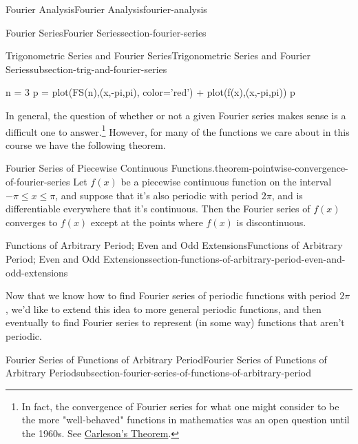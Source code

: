 \documentclass[oneside,10pt,]{book}
\numberwithin{equation}{section}
\begin{document}
\begin{chapterptx}{Fourier Analysis}{}{Fourier Analysis}{}{}{fourier-analysis}
\begin{sectionptx}{Fourier Series}{}{Fourier Series}{}{}{section-fourier-series}
\begin{subsectionptx}{Trigonometric Series and Fourier Series}{}{Trigonometric Series and Fourier Series}{}{}{subsection-trig-and-fourier-series}
\begin{sageinput}
n = 3
p = plot(FS(n),(x,-pi,pi), color='red') + plot(f(x),(x,-pi,pi))
p
\end{sageinput}
\hypertarget{p-585}{}%
In general, the question of whether or not a given Fourier series makes sense is a difficult one to answer.\footnote{In fact, the convergence of Fourier series for what one might consider to be the more "well-behaved" functions in mathematics was an open question until the 1960s. See \href{https://en.wikipedia.org/wiki/Carleson\%27s_theorem}{Carleson's Theorem}.\label{footnote-convergence-of-fourier-series}} However, for many of the functions we care about in this course we have the following theorem.%
\begin{theorem}{Fourier Series of Piecewise Continuous Functions.}{}{theorem-pointwise-convergence-of-fourier-series}%
\hypertarget{p-586}{}%
Let \(f(x)\) be a piecewise continuous function on the interval \(-\pi\leq x\leq\pi\), and suppose that it's also periodic with period \(2\pi\), and is differentiable everywhere that it's continuous. Then the Fourier series of \(f(x)\) converges to \(f(x)\) except at the points where \(f(x)\) is discontinuous.%
\end{theorem}
\end{subsectionptx}
\end{sectionptx}
%
%
\typeout{************************************************}
\typeout{************************************************}
%
\begin{sectionptx}{Functions of Arbitrary Period; Even and Odd Extensions}{}{Functions of Arbitrary Period; Even and Odd Extensions}{}{}{section-functions-of-arbitrary-period-even-and-odd-extensions}
\begin{introduction}{}%
\hypertarget{p-587}{}%
Now that we know how to find Fourier series of periodic functions with period \(2\pi\), we'd like to extend this idea to more general periodic functions, and then eventually to find Fourier series to represent (in some way) functions that aren't periodic.%
\end{introduction}%
%
%
\typeout{************************************************}
\typeout{************************************************}
%
\begin{subsectionptx}{Fourier Series of Functions of Arbitrary Period}{}{Fourier Series of Functions of Arbitrary Period}{}{}{subsection-fourier-series-of-functions-of-arbitrary-period}

\end{subsectionptx}
\end{sectionptx}
\end{chapterptx}
\end{document}
